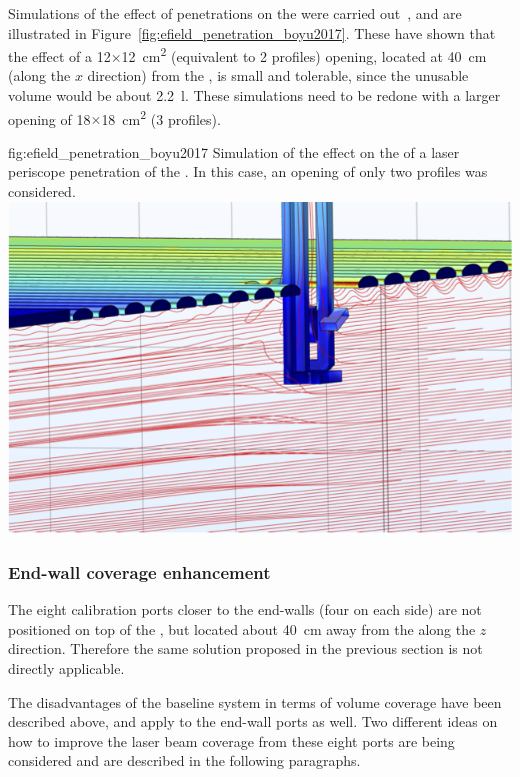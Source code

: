 Simulations of the effect of  penetrations on the \efield were carried out~\cite{bib:yu2017b}, and are illustrated in Figure~\ref{fig:efield_penetration_boyu2017}. These have shown that the effect of a \num{12}$\times$\SI{12}{\square\cm} (equivalent to \num{2} profiles) opening, located at \SI{40}{\cm} (along the $x$ direction) from the , is small and tolerable, since the unusable volume would be about \SI{2.2}{\litre}. These simulations need to be redone with a larger opening of \num{18}$\times$\SI{18}{\square\cm} (\num{3} profiles).

\begin{dunefigure}{fig:efield_penetration_boyu2017}
{Simulation of the effect on the \efield of a laser periscope penetration of the . In this case, an opening of only two profiles was considered.}
\includegraphics[width=0.8\linewidth]{graphics/efield_penetration_boyu2017.png}
\end{dunefigure}





\subsubsection{End-wall coverage enhancement}

The eight calibration ports closer to the end-walls (four on each side) are not positioned on top of the , but located about \SI{40}{\cm} away from the  along the $z$ direction.
Therefore the same solution proposed in the previous section is not directly applicable.

The disadvantages of the baseline system in terms of volume coverage have been described above, and apply to the end-wall ports as well. Two different ideas on how to improve the laser beam coverage from these eight ports are being considered and are described in the following paragraphs.

